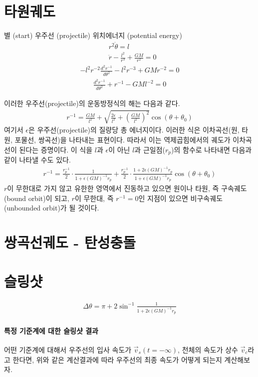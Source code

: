 \documentclass[10pt]{amsbook}
\begin{document}
\section{타원궤도}
별 (start) 우주선 (projectile) 위치에너지 (potential energy)
\begin{align}
&r^2 \dot{\theta} = l
\\&\ddot{r}-\frac{l^2}{r^3}+\frac{GM}{r^2} = 0
\end{align}
\begin{align}
	-l^2r^{-2}\frac{d^2r^{-1}}{d\theta^2}-l^2r^{-3}+GMr^{-2} = 0
\end{align}
\begin{align}
	\frac{d^2r^{-1}}{d\theta^2}+r^{-1}-GMl^{-2} = 0
\end{align}

이러한 우주선(projectile)의 운동방정식의 해는 다음과 같다.
\begin{align}
	r^{-1} = \frac{GM}{l^2} + \sqrt{\frac{2\epsilon}{l^2}+\left(\frac{GM}{l^2}\right)^2}\cos(\theta+\theta_0)
\end{align}
여기서 $\epsilon$은 우주선(projectile)의 질량당 총 에너지이다. 이러한 식은 이차곡선(원, 타원, 포물선, 쌍곡선)을 나타내는 표현이다. 따라서 이는 역제곱힘에서의 궤도가 이차곡선이 된다는 증명이다.
이 식을 $l$과 $\epsilon$이 아닌 $l$과 근일점($r_p$)의 함수로 나타내면 다음과 같이 나타낼 수도 있다.
\begin{align}
	r^{-1} = \frac{r_p^{-1}}{2}\cdot\frac{1}{1+\epsilon (GM)^{-1}r_p} +\frac{r_p^{-1}}{2}\cdot\frac{1+2\epsilon (GM)^{-1}r_p}{1+\epsilon (GM)^{-1}r_p}\cos(\theta+\theta_0)
\end{align}
$r$이 무한대로 가지 않고 유한한 영역에서 진동하고 있으면 원이나 타원, 즉 구속궤도(bound orbit)이 되고, $r$이 무한대, 즉 $r^{-1}=0$인 지점이 있으면 비구속궤도(unbounded orbit)가 될 것이다.

\section{쌍곡선궤도 - 탄성충돌}
\section{슬링샷}

\begin{align}
	\Delta \theta = \pi + 2\sin^{-1}\frac{1}{{1+2\epsilon (GM)^{-1}r_p}}
\end{align}

\paragraph{특정 기준계에 대한 슬링샷 결과}
어떤 기준계에 대해서 우주선의 입사 속도가 $\vec{v}_s(t=-\infty)$, 천체의 속도가 상수 $\vec{v}_c$라고 한다면, 위와 같은 계산결과에 따라 우주선의 최종 속도가 어떻게 되는지 계산해보자.
\end{document}
